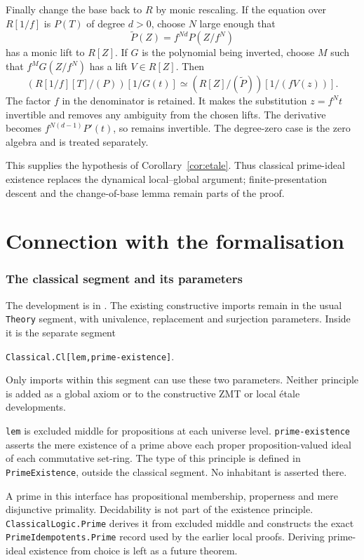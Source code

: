 \documentclass[11pt]{article}
\begin{document}
Finally change the base back to $R$ by monic rescaling. If the equation
over $R[1/f]$ is $P(T)$ of degree $d>0$, choose $N$ large enough that
\[
 \widetilde P(Z)=f^{Nd}P(Z/f^N)
\]
has a monic lift to $R[Z]$. If $G$ is the polynomial being inverted,
choose $M$ such that $f^M G(Z/f^N)$ has a lift $V\in R[Z]$. Then
\[
 (R[1/f][T]/(P))[1/G(t)]
 \simeq (R[Z]/(\widetilde P))[1/(fV(z))].
\]
The factor $f$ in the denominator is retained. It makes the substitution
$z=f^Nt$ invertible and removes any ambiguity from the chosen lifts.
The derivative becomes $f^{N(d-1)}P'(t)$, so remains invertible.
The degree-zero case is the zero algebra and is treated separately.

This supplies the hypothesis of Corollary~\ref{cor:etale}. Thus classical
prime-ideal existence replaces the dynamical local--global argument;
finite-presentation descent and the change-of-base lemma remain parts
of the proof.

\part{Connection with the formalisation}

\section{The classical segment and its parameters}

The development is in .
The existing constructive imports remain in the usual \texttt{Theory}
segment, with univalence, replacement and surjection parameters.
Inside it is the separate segment
\begin{center}
\texttt{Classical.Cl[lem,prime-existence]}.
\end{center}
Only imports within this segment can use these two parameters.
Neither principle is added as a global axiom or to the constructive
ZMT or local \'etale developments.

\texttt{lem} is excluded middle for propositions at each universe level.
\texttt{prime-existence} asserts the mere existence of a prime above
each proper proposition-valued ideal of each commutative set-ring.
The type of this principle is defined in \texttt{PrimeExistence},
outside the classical segment. No inhabitant is asserted there.

A prime in this interface has propositional membership, properness and
mere disjunctive primality. Decidability is not part of the existence
principle. \texttt{ClassicalLogic.Prime} derives it from excluded middle
and constructs the exact \texttt{PrimeIdempotents.Prime} record used by
the earlier local proofs. Deriving prime-ideal existence from choice is
left as a future theorem.
\end{document}
